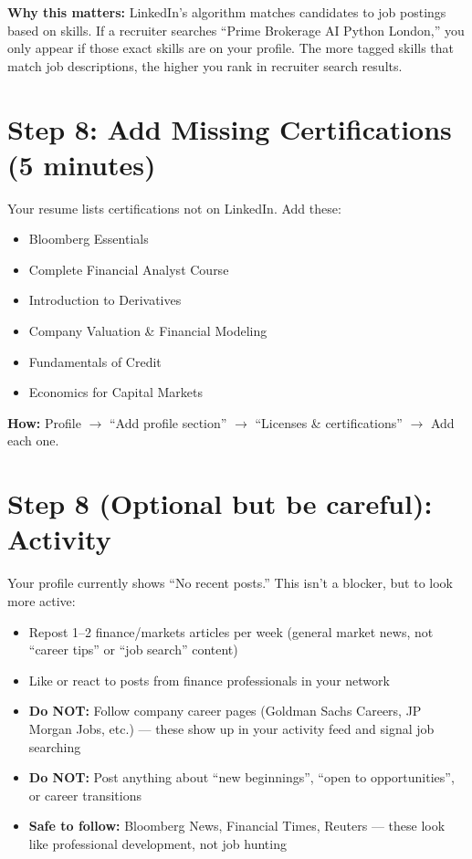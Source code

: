 \documentclass[11pt,a4paper]{article}
\begin{document}
\vspace{6pt}
{\small\textbf{Why this matters:} LinkedIn's algorithm matches candidates to job postings based on skills. If a recruiter searches ``Prime Brokerage AI Python London,'' you only appear if those exact skills are on your profile. The more tagged skills that match job descriptions, the higher you rank in recruiter search results.}

\section{Step 8: Add Missing Certifications (5 minutes)}

Your resume lists certifications not on LinkedIn. Add these:

\begin{itemize}[leftmargin=1.2em]
    \item Bloomberg Essentials
    \item Complete Financial Analyst Course
    \item Introduction to Derivatives
    \item Company Valuation \& Financial Modeling
    \item Fundamentals of Credit
    \item Economics for Capital Markets
\end{itemize}

\textbf{How:} Profile $\rightarrow$ ``Add profile section'' $\rightarrow$ ``Licenses \& certifications'' $\rightarrow$ Add each one.

\section{Step 8 (Optional but be careful): Activity}

Your profile currently shows ``No recent posts.'' This isn't a blocker, but to look more active:

\begin{itemize}[leftmargin=1.2em]
    \item Repost 1--2 finance/markets articles per week (general market news, not ``career tips'' or ``job search'' content)
    \item Like or react to posts from finance professionals in your network
    \item \textbf{Do NOT:} Follow company career pages (Goldman Sachs Careers, JP Morgan Jobs, etc.) --- these show up in your activity feed and signal job searching
    \item \textbf{Do NOT:} Post anything about ``new beginnings'', ``open to opportunities'', or career transitions
    \item \textbf{Safe to follow:} Bloomberg News, Financial Times, Reuters --- these look like professional development, not job hunting
\end{itemize}
\end{document}
